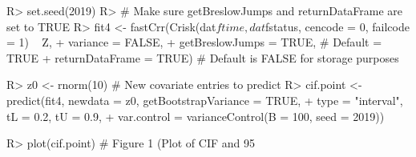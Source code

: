 \begin{example}
R> set.seed(2019)
R> # Make sure getBreslowJumps and returnDataFrame are set to TRUE
R> fit4 <- fastCrr(Crisk(dat$ftime, dat$fstatus, cencode = 0, failcode = 1) ~ Z,
+                           variance = FALSE,
+                           getBreslowJumps = TRUE, # Default = TRUE
+                           returnDataFrame = TRUE) # Default is FALSE for storage purposes
 
R> z0 <- rnorm(10) # New covariate entries to predict
R> cif.point <- predict(fit4, newdata = z0, getBootstrapVariance = TRUE,
+                      type = "interval", tL = 0.2, tU = 0.9,
+                      var.control = varianceControl(B = 100, seed = 2019))

R> plot(cif.point) # Figure 1 (Plot of CIF and 95%
\end{example}

